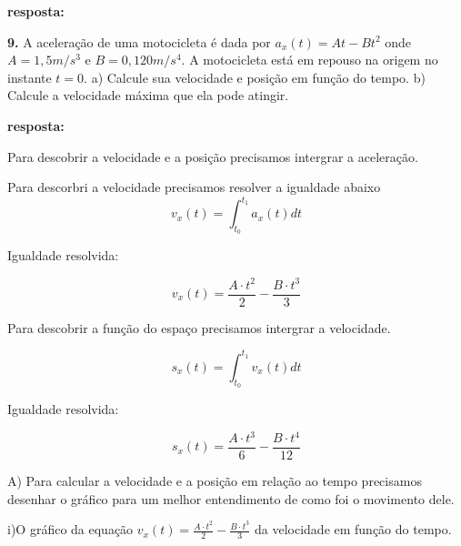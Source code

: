 \documentclass[a4paper, 12pt]{article}
\begin{document}
\begin{flushleft}
		\textbf{resposta:}
		
		\textbf{9.} A aceleração de uma motocicleta é dada por $a_x(t) = At - Bt^2$ onde $A = 1,5m/s^3$ e $B = 0,120 m/s^4$. A motocicleta está em repouso na origem no instante $t = 0$. a) Calcule sua velocidade e posição em função do tempo. b) Calcule a velocidade máxima que ela pode atingir.
		
		\textbf{resposta:}
		
		Para descobrir a velocidade e a posição precisamos intergrar a aceleração.
		
		Para descorbri a velocidade precisamos resolver a igualdade abaixo
		\begin{equation*}
			v_x(t) = \int_{t_0}^{t_1} a_x(t)dt
		\end{equation*}
		
		Igualdade resolvida:
		
		\begin{equation*}
			v_x(t) = \frac{A \cdot t^2}{2} - \frac{B \cdot t^3}{3}
		\end{equation*}
		
		Para descobrir a função do espaço precisamos intergrar a velocidade.
		
		\begin{equation*}
			s_x(t) = \int_{t_0}^{t_1} v_x(t)dt
		\end{equation*}
		
		Igualdade resolvida:
		
		\begin{equation*}
			s_x(t) = \frac{A \cdot t^3}{6} - \frac{B \cdot t^4}{12}
		\end{equation*}
		
		A) Para calcular a velocidade e a posição em relação ao tempo precisamos desenhar o gráfico para um melhor entendimento de como foi o movimento dele.
		
		i)O gráfico da equação $v_x(t) = \frac{A \cdot t^2}{2} - \frac{B \cdot t^3}{3}$ da velocidade em função do tempo.
		
		\begin{center}
		\end{center}
		

\end{flushleft}
\end{document}
